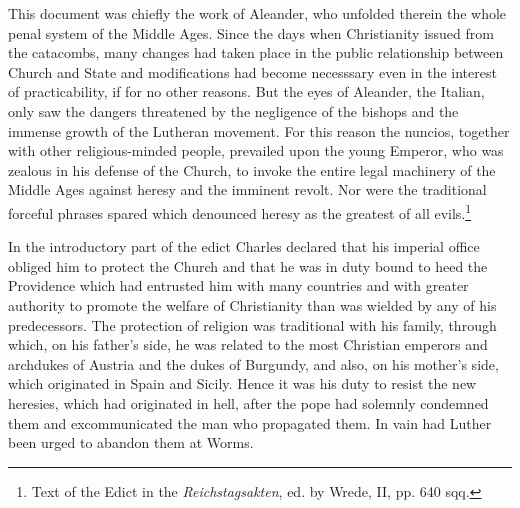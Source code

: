 This document was chiefly the work of Aleander, who unfolded
therein the whole penal system of the Middle Ages. Since the days
when Christianity issued from the catacombs, many changes had taken
place in the public relationship between Church and State and
modifications had become necesssary even in the interest of practicability,
if for no other reasons. But the eyes of Aleander, the Italian,
only saw the dangers threatened by the negligence of the bishops
and the immense growth of the Lutheran movement. For this reason
the nuncios, together with other religious-minded people, prevailed
upon the young Emperor, who was zealous in his defense of the
Church, to invoke the entire legal machinery of the Middle Ages
against heresy and the imminent revolt. Nor were the traditional
forceful phrases spared which denounced heresy as the greatest of all
evils.\footnote{Text of the Edict in the \textit{Reichstagsakten}, ed. by Wrede, II, pp. 640 sqq.}

In the introductory part of the edict Charles declared that his imperial
office obliged him to protect the Church and that he was in duty bound to
heed the Providence which had entrusted him with many countries and with
greater authority to promote the welfare of Christianity than was wielded
by any of his predecessors. The protection of religion was traditional with
his family, through which, on his father’s side, he was related to the most
Christian emperors and archdukes of Austria and the dukes of Burgundy,
and also, on his mother’s side, which originated in Spain and Sicily. Hence
it was his duty to resist the new heresies, which had originated in hell, after
the pope had solemnly condemned them and excommunicated the man who
propagated them. In vain had Luther been urged to abandon them at
Worms.

